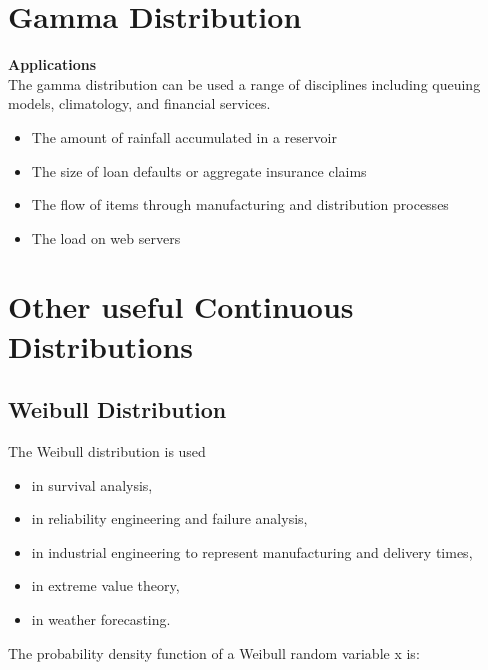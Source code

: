 \documentclass[]{report}
\begin{document}
\newpage
\section{Gamma Distribution}

\textbf{Applications}\\
The gamma distribution can be used a range of disciplines including queuing models, climatology, and financial services. 
\begin{itemize}
\item The amount of rainfall accumulated in a reservoir
\item The size of loan defaults or aggregate insurance claims
\item The flow of items through manufacturing and distribution processes
\item The load on web servers
\end{itemize}

\section{Other useful Continuous Distributions}




\subsection{Weibull Distribution}
The Weibull distribution is used
\begin{itemize}
\item in survival analysis,
\item in reliability engineering and failure analysis,
\item in industrial engineering to represent manufacturing and delivery times,
\item in extreme value theory,
\item in weather forecasting.
\end{itemize}

The probability density function of a Weibull random variable x is:
\end{document}
